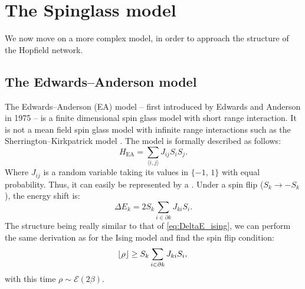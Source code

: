 \section{The Spinglass model}
We now move on a more complex model, in order to approach the structure of the Hopfield network.
\subsection{The Edwards–Anderson model}
The Edwards–Anderson (EA) model -- first introduced by Edwards and Anderson in 1975 \cite{SFEdwards_1975} -- is a finite dimensional spin glass model with short range interaction. It is not a mean field spin glass model with infinite range interactions such as the Sherrington–Kirkpatrick model \cite{SK_model}. The model is formally described as follows:
\begin{equation}
  H_\text{EA}=\sum_{\langle i,j \rangle}J_{ij}S_iS_j.
  \label{eq:EA_model}
\end{equation}
Where $J_{ij}$ is a random variable taking its values in $\{-1,\,1\}$ with equal probability. Thus, it can easily be represented by a \Bits.
Under a spin flip ($S_k \to - S_k$), the energy shift is:
\begin{equation}
  \Delta E_k=2 S_k \sum_{i \in \partial k}J_{ki}S_i.
  \label{eq:DeltaE_EA}
\end{equation}
The structure being really similar to that of \eqref{eq:DeltaE_ising}, we can perform the same derivation as for the Ising model and find the spin flip condition:
\begin{equation}
  \lfloor \rho \rfloor \geq S_k  \sum_{i \in \partial k}J_{ki}S_i,\\
  \label{eq:flip_EA_int}
\end{equation}
with this time $\rho \sim \mathcal{E}(2\beta)$.
